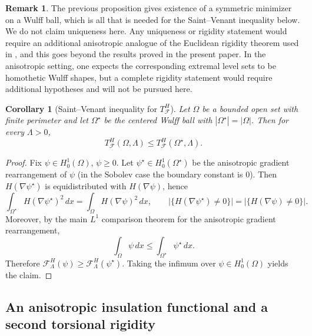 \documentclass[oneside,a4paper,12pt,notitlepage]{article}
\newtheorem{corollary}[theorem]{Corollary}
\theoremstyle{definition}
\newtheorem{remark}[theorem]{Remark}
\begin{document}
\begin{remark}\label{rem:conditional_uniqueness}
The previous proposition gives existence of a symmetric minimizer on a Wulff ball,
which is all that is needed for the Saint--Venant inequality below. We do not
claim uniqueness here. Any uniqueness or rigidity statement would require an additional
anisotropic analogue of the Euclidean rigidity theorem used in \cite{AGNT24}, and this
goes beyond the results proved in the present paper.
 In the anisotropic
setting, one expects the corresponding extremal level sets to be homothetic Wulff
shapes, but a complete rigidity statement would require additional hypotheses and
will not be pursued here.
\end{remark}



\begin{corollary}[Saint--Venant inequality for $T_{\mathcal F}^H$]\label{cor:SV_TF_aniso}
Let $\Omega$ be a bounded open set with finite perimeter and let $\Omega^\star$ be the centered Wulff ball with $|\Omega^\star|=|\Omega|$.
Then for every $\Lambda>0$,
\[
T_{\mathcal F}^H(\Omega,\Lambda)\le T_{\mathcal F}^H(\Omega^\star,\Lambda).
\]
\end{corollary}

\begin{proof}
Fix $\psi\in H_0^1(\Omega)$, $\psi\ge 0$.
Let $\psi^\star\in H_0^1(\Omega^\star)$ be the anisotropic gradient rearrangement of $\psi$ (in the Sobolev case the boundary constant is $0$).
Then $H(\nabla\psi^\star)$ is equidistributed with $H(\nabla\psi)$, hence
\[
\int_{\Omega^\star}H(\nabla\psi^\star)^2\,dx=\int_{\Omega}H(\nabla\psi)^2\,dx,
\qquad
\big|\{H(\nabla\psi^\star)\neq 0\}\big|=\big|\{H(\nabla\psi)\neq 0\}\big|.
\]
Moreover, by the main $L^1$ comparison theorem for the anisotropic gradient rearrangement,
\[
\int_{\Omega}\psi\,dx\le \int_{\Omega^\star}\psi^\star\,dx.
\]
Therefore $\mathcal F^H_\Lambda(\psi)\ge \mathcal F^H_\Lambda(\psi^\star)$.
Taking the infimum over $\psi\in H_0^1(\Omega)$ yields the claim.
\end{proof}




\subsection{An anisotropic insulation functional and a second torsional rigidity}
\end{document}
